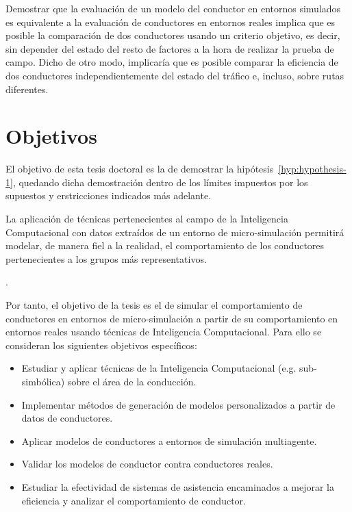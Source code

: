 Demostrar que la evaluación de un modelo del conductor en entornos simulados es equivalente a la evaluación de conductores en entornos reales implica que es posible la comparación de dos conductores usando un criterio objetivo, es decir, sin depender del estado del resto de factores a la hora de realizar la prueba de campo. Dicho de otro modo, implicaría que es posible comparar la eficiencia de dos conductores independientemente del estado del tráfico e, incluso, sobre rutas diferentes.

\section{Objetivos}
\label{ch:intro:objectives}

El objetivo de esta tesis doctoral es la de demostrar la hipótesis~\ref{hyp:hypothesis-1}, quedando dicha demostración dentro de los límites impuestos por los supuestos y erstricciones indicados más adelante.

\begin{hyp} \label{hyp:hypothesis-1}
	La aplicación de técnicas pertenecientes al campo de la Inteligencia Computacional con datos extraídos de un entorno de micro-simulación permitirá modelar, de manera fiel a la realidad, el comportamiento de los conductores pertenecientes a los grupos más representativos.
\end{hyp}

.

Por tanto, el objetivo de la tesis es el de simular el comportamiento de conductores en entornos de micro-simulación a partir de su comportamiento en entornos reales usando técnicas de Inteligencia Computacional. Para ello se consideran los siguientes objetivos específicos:

\begin{itemize}
	\item Estudiar y aplicar técnicas de la Inteligencia Computacional (e.g. sub-simbólica) sobre el área de la conducción.
	\item Implementar métodos de generación de modelos personalizados a partir de datos de conductores.
	\item Aplicar modelos de conductores a entornos de simulación multiagente.
	\item Validar los modelos de conductor contra conductores reales.
	\item Estudiar la efectividad de sistemas de asistencia encaminados a mejorar la eficiencia y analizar el comportamiento de conductor.
\end{itemize}

